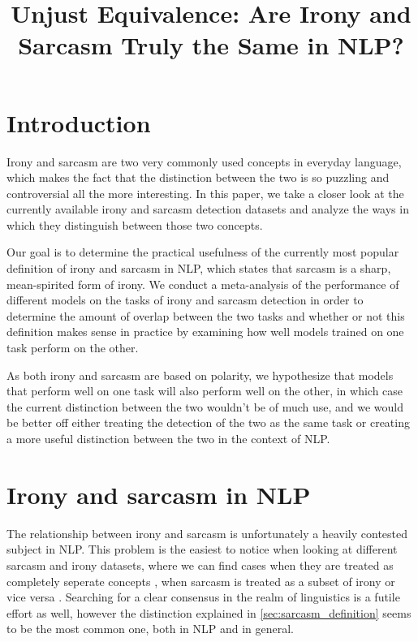 \documentclass[10pt, a4paper]{article}
\title{Unjust Equivalence: Are Irony and Sarcasm Truly the Same in NLP?}
\begin{document}
\maketitleabstract

\section{Introduction}

Irony and sarcasm are two very commonly used concepts in everyday language, which makes the fact that the distinction 
between the two is so puzzling and controversial all the more interesting. In this paper, we take a closer look at the
currently available irony and sarcasm detection datasets and analyze the ways in which they distinguish between those two
concepts.

Our goal is to determine the practical usefulness of the currently most popular definition of irony and sarcasm in NLP, which
states that sarcasm is a sharp, mean-spirited form of irony. We conduct a meta-analysis of the performance of different
models on the tasks of irony and sarcasm detection in order to determine the amount of overlap between the two tasks and
whether or not this definition makes sense in practice by examining how well models trained on one task perform on the other.

As both irony and sarcasm are based on polarity, we hypothesize that models that perform well on one task will also perform
well on the other, in which case the current distinction between the two wouldn't be of much use, and we would be better off
either treating the detection of the two as the same task or creating a more useful distinction between the two in the context
of NLP.

\section{Irony and sarcasm in NLP}
The relationship between irony and sarcasm is unfortunately a heavily contested subject in NLP. This problem is the easiest
to notice when looking at different sarcasm and irony datasets, where we can find cases when they are treated as completely
seperate concepts \citep{kaggle-tweets}, when sarcasm is treated as a subset of irony \citep{semeval-2018} or vice
versa \citep{iSarcasm}. Searching for a clear consensus in the realm of linguistics is a futile effort as well, however the
distinction explained in \ref{sec:sarcasm_definition} seems to be the most common one, both in NLP and in general.
\end{document}
